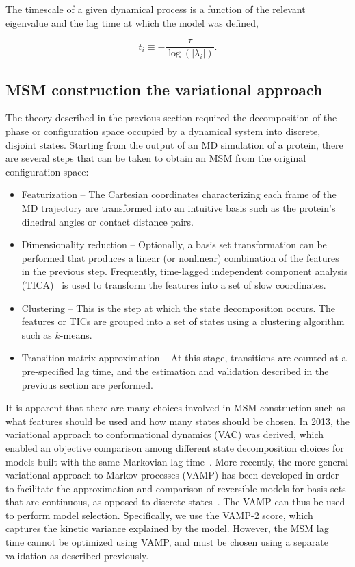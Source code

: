 \documentclass[9pt,tutorial]{livecoms}
\begin{document}
The timescale of a given dynamical process is a function of the relevant eigenvalue and the lag time at which the model was defined,

\begin{equation}
\label{eq:timescales}
t_i \equiv -\frac{\tau}{\log(|\lambda_i|)}.
\end{equation}

\subsection{MSM construction the variational approach}
\label{sec:construction}

The theory described in the previous section required the decomposition of the phase or configuration space occupied by a dynamical system into discrete, disjoint states.
Starting from the output of an MD simulation of a protein, there are several steps that can be taken to obtain an MSM from the original configuration space:

\begin{itemize}
	\item Featurization -- The Cartesian coordinates characterizing each frame of the MD trajectory are transformed into an intuitive basis such as the protein's dihedral angles or contact distance pairs.
	\item Dimensionality reduction -- Optionally, a basis set transformation can be performed that produces a linear (or nonlinear) combination of the features in the previous step.
	Frequently, time-lagged independent component analysis (TICA)~\cite{tica,tica3,tica2,kinetic-maps} is used to transform the features into a set of slow coordinates.
	\item Clustering -- This is the step at which the state decomposition occurs.
	The features or TICs are grouped into a set of states using a clustering algorithm such as $k$-means.
	\item Transition matrix approximation -- At this stage, transitions are counted at a pre-specified lag time, and the estimation and validation described in the previous section are performed.
\end{itemize}

It is apparent that there are many choices involved in MSM construction such as what features should be used and how many states should be chosen.
In 2013, the variational approach to conformational dynamics (VAC) was derived, which enabled an objective comparison among different state decomposition choices for models built with the same Markovian lag time~\cite{noe-vac}.
More recently, the more general variational approach to Markov processes (VAMP) has been developed in order to facilitate the approximation and comparison of reversible models for basis sets that are continuous, as opposed to discrete states~\cite{vamp-preprint}.
The VAMP can thus be used to perform model selection.
Specifically, we use the VAMP-2 score, which captures the kinetic variance explained by the model.
However, the MSM lag time cannot be optimized using VAMP, and must be chosen using a separate validation as described previously.
\end{document}
